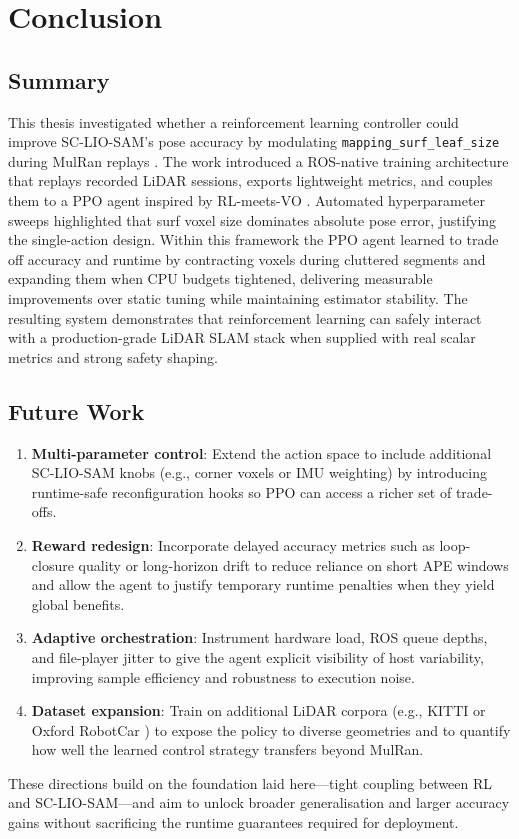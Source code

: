\chapter[Conclusion]{Conclusion}
\label{Chap:Conclusion}

\section{Summary}
This thesis investigated whether a reinforcement learning controller could improve SC-LIO-SAM’s pose accuracy by modulating \texttt{mapping\_surf\_leaf\_size} during MulRan replays \cite{shan_2020_liosam,kim_2020_mulran}. The work introduced a ROS-native training architecture that replays recorded LiDAR sessions, exports lightweight metrics, and couples them to a PPO agent inspired by RL-meets-VO \cite{nicomessikommer_2024_reinforcement}. Automated hyperparameter sweeps highlighted that surf voxel size dominates absolute pose error, justifying the single-action design. Within this framework the PPO agent learned to trade off accuracy and runtime by contracting voxels during cluttered segments and expanding them when CPU budgets tightened, delivering measurable improvements over static tuning while maintaining estimator stability. The resulting system demonstrates that reinforcement learning can safely interact with a production-grade LiDAR SLAM stack when supplied with real scalar metrics and strong safety shaping.

\section{Future Work}
\begin{enumerate}[label=\textbf{F\arabic*}]
  \item \textbf{Multi-parameter control}: Extend the action space to include additional SC-LIO-SAM knobs (e.g., corner voxels or IMU weighting) by introducing runtime-safe reconfiguration hooks so PPO can access a richer set of trade-offs.
  \item \textbf{Reward redesign}: Incorporate delayed accuracy metrics such as loop-closure quality or long-horizon drift to reduce reliance on short APE windows and allow the agent to justify temporary runtime penalties when they yield global benefits.
  \item \textbf{Adaptive orchestration}: Instrument hardware load, ROS queue depths, and file-player jitter to give the agent explicit visibility of host variability, improving sample efficiency and robustness to execution noise.
  \item \textbf{Dataset expansion}: Train on additional LiDAR corpora (e.g., KITTI \cite{geiger_2012_are} or Oxford RobotCar \cite{maddern_2016_1}) to expose the policy to diverse geometries and to quantify how well the learned control strategy transfers beyond MulRan.
\end{enumerate}

These directions build on the foundation laid here—tight coupling between RL and SC-LIO-SAM—and aim to unlock broader generalisation and larger accuracy gains without sacrificing the runtime guarantees required for deployment.

